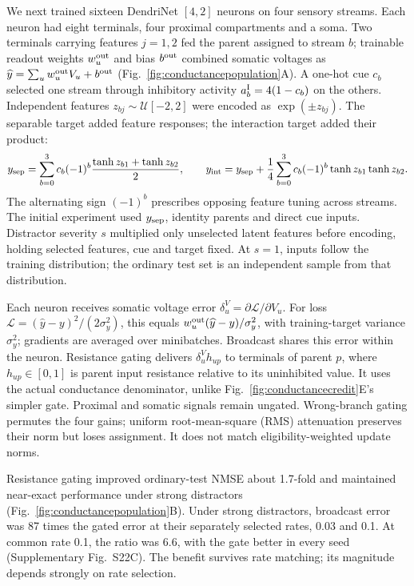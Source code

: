 \documentclass[11pt]{article}
\begin{document}
We next trained sixteen DendriNet $[4,2]$ neurons on four sensory streams. Each neuron had eight terminals, four proximal compartments and a soma. Two terminals carrying features $j=1,2$ fed the parent assigned to stream $b$; trainable readout weights $w_u^{\rm out}$ and bias $b^{\rm out}$ combined somatic voltages as $\widehat y=\sum_u w_u^{\rm out}V_u+b^{\rm out}$ (Fig.~\ref{fig:conductancepopulation}A). A one-hot cue $c_b$ selected one stream through inhibitory activity $a_b^{\rm I}=4(1-c_b)$ on the others. Independent features $z_{bj}\sim\mathcal U[-2,2]$ were encoded as $\exp(\pm z_{bj})$. The separable target added feature responses; the interaction target added their product:
\[
y_{\rm sep}=\sum_{b=0}^3c_b(-1)^b\frac{\tanh z_{b1}+\tanh z_{b2}}2,
\qquad
y_{\rm int}=y_{\rm sep}+\frac14\sum_{b=0}^3c_b(-1)^b\tanh z_{b1}\tanh z_{b2}.
\]
The alternating sign $(-1)^b$ prescribes opposing feature tuning across streams. The initial experiment used $y_{\rm sep}$, identity parents and direct cue inputs. Distractor severity $s$ multiplied only unselected latent features before encoding, holding selected features, cue and target fixed. At $s=1$, inputs follow the training distribution; the ordinary test set is an independent sample from that distribution.

Each neuron receives somatic voltage error $\delta_u^V=\partial\mathcal L/\partial V_u$. For loss $\mathcal L=(\widehat y-y)^2/(2\sigma_y^2)$, this equals $w_u^{\rm out}(\widehat y-y)/\sigma_y^2$, with training-target variance $\sigma_y^2$; gradients are averaged over minibatches. Broadcast shares this error within the neuron. Resistance gating delivers $\delta_u^Vh_{up}$ to terminals of parent $p$, where $h_{up}\in[0,1]$ is parent input resistance relative to its uninhibited value. It uses the actual conductance denominator, unlike Fig.~\ref{fig:conductancecredit}E's simpler gate. Proximal and somatic signals remain ungated. Wrong-branch gating permutes the four gains; uniform root-mean-square (RMS) attenuation preserves their norm but loses assignment. It does not match eligibility-weighted update norms.

Resistance gating improved ordinary-test NMSE about 1.7-fold and maintained near-exact performance under strong distractors (Fig.~\ref{fig:conductancepopulation}B). Under strong distractors, broadcast error was 87 times the gated error at their separately selected rates, 0.03 and 0.1. At common rate 0.1, the ratio was 6.6, with the gate better in every seed (Supplementary Fig.~S22C). The benefit survives rate matching; its magnitude depends strongly on rate selection.
\end{document}
